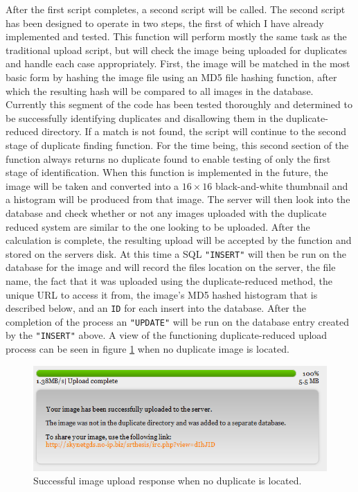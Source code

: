 After the first script completes, a second script will be called. The second script has been designed to operate in two steps, the first of which I have already implemented and tested. This function will perform mostly the same task as the traditional upload script, but will check the image being uploaded for duplicates and handle each case appropriately. First, the image will be matched in the most basic form by hashing the image file using an MD5 file hashing function, after which the resulting hash will be compared to all images in the database. Currently this segment of the code has been tested thoroughly and determined to be successfully identifying duplicates and disallowing them in the duplicate-reduced directory. If a match is not found, the script will continue to the second stage of duplicate finding function. For the time being, this second section of the function always returns no duplicate found to enable testing of only the first stage of identification. When this function is implemented in the future, the image will be taken and converted into a $16\times 16$ black-and-white thumbnail and a histogram will be produced from that image. The server will then look into the database and check whether or not any images uploaded with the duplicate reduced system are similar to the one looking to be uploaded. After the calculation is complete, the resulting upload will be accepted by the function and stored on the servers disk. At this time a SQL {\tt "INSERT"} will then be run on the database for the image and will record the files location on the server, the file name, the fact that it was uploaded using the duplicate-reduced method, the unique URL to access it from, the image's MD5 hashed histogram that is described below, and an {\tt ID} for each insert into the database. After the completion of the process an {\tt "UPDATE"} will be run on the database entry created by the {\tt "INSERT"} above. A view of the functioning duplicate-reduced upload process can be seen in figure \ref{success_nodupfound} when no duplicate image is located.

\begin{figure}[htbp]
\centering
\includegraphics[width=5.5in]{success_nodupfound}
\caption{Successful image upload response when no duplicate is located.}
\label{success_nodupfound}
\end{figure}

